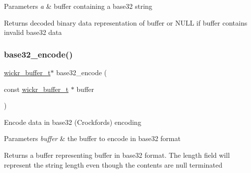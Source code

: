 \begin{DoxyParams}{Parameters}
{\em a} & buffer containing a base32 string \\
\hline
\end{DoxyParams}
\begin{DoxyReturn}{Returns}
decoded binary data representation of \textquotesingle{}buffer\textquotesingle{} or N\+U\+LL if \textquotesingle{}buffer\textquotesingle{} contains invalid base32 data 
\end{DoxyReturn}
\mbox{\label{group__base32_ga343c12edab05fb3b98a18474e20487c6}} 
\subsubsection{\texorpdfstring{base32\_encode()}{base32\_encode()}}
{\footnotesize\ttfamily \mbox{\hyperlink{structwickr__buffer}{wickr\+\_\+buffer\+\_\+t}}$\ast$ base32\+\_\+encode (\begin{DoxyParamCaption}\item[{const \mbox{\hyperlink{structwickr__buffer}{wickr\+\_\+buffer\+\_\+t}} $\ast$}]{buffer }\end{DoxyParamCaption})}

Encode data in base32 (Crockford\textquotesingle{}s) encoding


\begin{DoxyParams}{Parameters}
{\em buffer} & the buffer to encode in base32 format \\
\hline
\end{DoxyParams}
\begin{DoxyReturn}{Returns}
a buffer representing \textquotesingle{}buffer\textquotesingle{} in base32 format. The length field will represent the string length even though the contents are null terminated 
\end{DoxyReturn}
